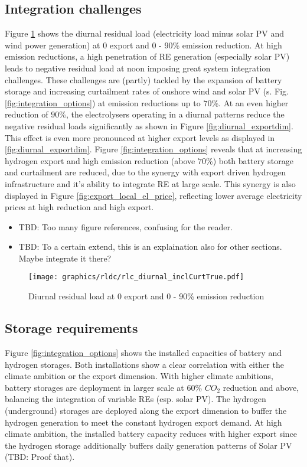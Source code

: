 \subsection{Integration challenges}
\label{subsec:integration_challenges}
Figure \ref{fig:diurnal} shows the diurnal residual load (electricity load minus solar PV and wind power generation) at 0 export and 0 - 90\% emission reduction. At high emission reductions, a high penetration of RE generation (especially solar PV) leads to negative residual load at noon imposing great system integration challenges.
These challenges are (partly) tackled by the expansion of battery storage and increasing curtailment rates of onshore wind and solar PV (s. Fig. \ref{fig:integration_options}) at emission reductions up to $70$\%. At an even higher reduction of $90$\%, the electrolysers operating in a diurnal patterns reduce the negative residual loads significantly as shown in Figure \ref{fig:diurnal_exportdim}. This effect is even more pronounced at higher export levels as displayed in \ref{fig:diurnal_exportdim}. 
Figure \ref{fig:integration_options} reveals that at increasing hydrogen export and high emission reduction (above $70$\%) both battery storage and curtailment are reduced, due to the synergy with export driven hydrogen infrastructure and it's ability to integrate RE at large scale. This synergy is also displayed in Figure \ref{fig:export_local_el_price}, reflecting lower average electricity prices at high reduction and high export.
\begin{itemize}
    \item TBD: Too many figure references, confusing for the reader.
    \item TBD: To a certain extend, this is an explaination also for other sections. Maybe integrate it there?
\end{itemize}


\begin{figure}[h!]
    \centering
    \texttt{[image: graphics/rldc/rlc\_diurnal\_inclCurtTrue.pdf]}
    \caption{Diurnal residual load at 0 export and 0 - 90\% emission reduction}
    \label{fig:diurnal}
\end{figure}

\subsection{Storage requirements}
Figure \ref{fig:integration_options} shows the installed capacities of battery and hydrogen storages. Both installations show a clear correlation with either the climate ambition or the export dimension. With higher climate ambitions, battery storages are deployment in larger scale at 60\% $CO_2$ reduction and above, balancing the integration of variable REs (esp. solar PV). The hydrogen (underground) storages are deployed along the export dimension to buffer the hydrogen generation to meet the constant hydrogen export demand. At high climate ambition, the installed battery capacity reduces with higher export since the hydrogen storage additionally buffers daily generation patterns of Solar PV (TBD: Proof that).


